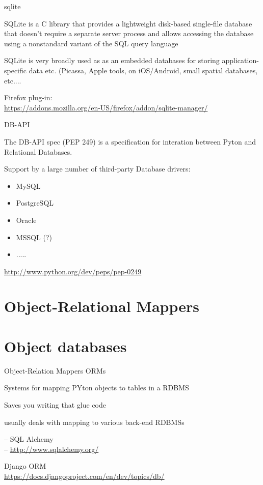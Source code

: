 \documentclass{beamer}
\begin{document}
\begin{frame}[fragile]{sqlite}

\vfill
{\Large SQLite is a C library that provides a lightweight disk-based single-file database
        that doesn't require a separate server process and allows accessing the
        database using a nonstandard variant of the SQL query language}

\vfill
{\Large SQLite is very broadly used as as an embedded databases for storing
        application-specific data etc. (Picassa, Apple tools, on iOS/Android,
        small spatial databases, etc....}


\vfill
Firefox plug-in:\\
\url{https://addons.mozilla.org/en-US/firefox/addon/sqlite-manager/}
\end{frame} 

\begin{frame}[fragile]{DB-API}

\vfill
{\Large The DB-API spec (PEP 249) is a specification for interation between Pyton and Relational Databases.}

\vfill
{\Large Support by a large number of third-party Database drivers:
\begin{itemize}
  \item MySQL
  \item PostgreSQL
  \item Oracle
  \item MSSQL (?)
  \item .....
\end{itemize}
}
\vfill
\url{http://www.python.org/dev/peps/pep-0249}
\end{frame} 


\section{Object-Relational Mappers}



\section{Object databases}

\begin{frame}[fragile]{Object-Relation Mappers}
{\LARGE ORMs}

\vfill
{\Large Systems for mapping PYton objects to tables in a RDBMS}

\vfill
{\Large Saves you writing that glue code}

\vfill
{\Large usually deals with mapping to various back-end RDBMSs}

\vfill
{\Large  -- SQL Alchemy}\\ 
 -- \url{http://www.sqlalchemy.org/}

{\Large Django ORM}\\
\url{https://docs.djangoproject.com/en/dev/topics/db/}

\end{frame} 
\end{document}
